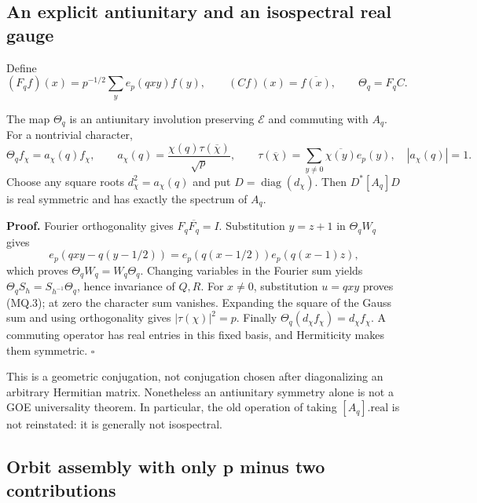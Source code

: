 \subsection{An explicit antiunitary and an isospectral real gauge}\label{magnetic:an-explicit-antiunitary-and-an-isospectral-real-gauge}

Define \[
 (F_qf)(x)=p^{-1/2}\sum_y e_p(qxy)f(y),\qquad
 (Cf)(x)=\overline{f(x)},\qquad \Theta_q=F_qC.
\]
\begin{proposition}\label{pass1:magnetic-1} The map \(\Theta_q\) is an antiunitary involution preserving \(\mathcal E\) and commuting with \(A_q\). For a nontrivial character, \[
 \Theta_q f_\chi=a_\chi(q)f_\chi,\qquad
 a_\chi(q)=\frac{\chi(q)\tau(\overline\chi)}{\sqrt p},\qquad
 \tau(\overline\chi)=\sum_{y\ne0}\overline{\chi(y)}e_p(y),
 \quad |a_\chi(q)|=1. \tag{MQ.3}
\] Choose any square roots \(d_\chi^2=a_\chi(q)\) and put \(D=\operatorname{diag}(d_\chi)\). Then \(D^*[A_q]D\) is real symmetric and has exactly the spectrum of \(A_q\).
\end{proposition}

\textbf{Proof.} Fourier orthogonality gives \(F_q\overline{F_q}=I\). Substitution \(y=z+1\) in \(\Theta_qW_q\) gives \[
 e_p(qxy-q(y-1/2))=e_p(q(x-1/2))e_p(q(x-1)z),
\] which proves \(\Theta_qW_q=W_q\Theta_q\). Changing variables in the Fourier sum yields \(\Theta_qS_h=S_{h^{-1}}\Theta_q\), hence invariance of \(Q,R\). For \(x\ne0\), substitution \(u=qxy\) proves (MQ.3); at zero the character sum vanishes. Expanding the square of the Gauss sum and using orthogonality gives \(|\tau(\chi)|^2=p\). Finally \(\Theta_q(d_\chi f_\chi)=d_\chi f_\chi\). A commuting operator has real entries in this fixed basis, and Hermiticity makes them symmetric. \(\square\)

This is a geometric conjugation, not conjugation chosen after diagonalizing an arbitrary Hermitian matrix. Nonetheless an antiunitary symmetry alone is not a GOE universality theorem. In particular, the old operation of taking \([A_q].\mathrm{real}\) is not reinstated: it is generally not isospectral.

\subsection{Orbit assembly with only p minus two contributions}\label{magnetic:orbit-assembly-with-only-p-minus-two-contributions}

